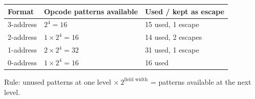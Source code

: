 \begin{center}
\renewcommand{\arraystretch}{1.3}
\begin{tabular}{l l l}
\toprule
\textbf{Format} & \textbf{Opcode patterns available} & \textbf{Used / kept as escape} \\
\midrule
3-address & $2^4 = 16$ & 15 used, 1 escape \\
2-address & $1 \times 2^4 = 16$ & 14 used, 2 escapes \\
1-address & $2 \times 2^4 = 32$ & 31 used, 1 escape \\
0-address & $1 \times 2^4 = 16$ & 16 used \\
\bottomrule
\end{tabular}

\smallskip
{\small Rule: unused patterns at one level $\times\ 2^{\text{field width}}$ = patterns available at the next level.}
\end{center}
